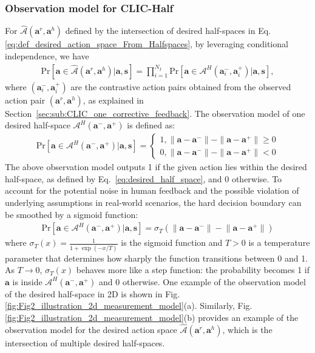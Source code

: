 \subsubsection{Observation model for CLIC-Half}
For $\hat {\mathcal{A}} {(\bm a^r, \bm a^h)}$ defined by the intersection of desired half-spaces in Eq. \eqref{eq:def_desired_action_space_From_Halfspaces}, by leveraging conditional independence, we have
\begin{align*}
    \text{Pr} [\bm a \in \hat {\mathcal{A}} {(\bm a^r, \bm a^h)}| \bm a , \bm s] =  \prod_{i=1}^{N_I} \text{Pr} [\bm a \in \mathcal{A}^H{ (\bm a^-_i, \bm a^{+}_i)}| \bm a, \bm s],
\end{align*}
where $(\bm a^-_i, \bm a^{+}_i)$ are the contrastive action pairs obtained from the observed action pair $(\bm a^r, \bm a^h)$, as explained in Section~\ref{sec:sub:CLIC_one_corrective_feedback}. The observation model of one desired half-space $\mathcal{A}^H {(\bm a^-, \bm a^+)}$ is defined as:
\begin{align*}
    \text{Pr} [\bm a \in \mathcal{A}^H {(\bm a^-, \bm a^+)} | \bm a , \bm s] \!= \!\!  \left\{ {\begin{array}{*{20}{c}}
	 1, \| \bm a- \bm a^-\| - \| \bm a- \bm a^+\| \geq 0\\
	  0, \| \bm a- \bm a^-\| - \| \bm a- \bm a^+\| < 0
	\end{array}} \right. 
\end{align*}
The above observation model outputs 1 if the given action lies within the desired half-space, as defined by Eq.~\eqref{eq:desired_half_space}, and 0 otherwise.
To account for the potential noise in human feedback and the possible violation of underlying assumptions in real-world scenarios, the hard decision boundary can be smoothed by a sigmoid function:
\begin{align}
    \text{Pr} [\bm a \in \mathcal{A}^H {(\bm a^-, \bm a^+)} | \bm a , \bm s] \!= \!  \sigma_T(\| \bm a- \bm a^-\| \!- \!\| \bm a- \bm a^+\|) \!\!
    \label{eq:observation_Model_half}
\end{align}
where $\sigma_T(x) = \frac{1}{1 + \exp (- x/T)}$ is the sigmoid function and $T > 0$ is a temperature parameter that determines how sharply the function transitions between 0 and 1. 
As $T \rightarrow 0$, $\sigma_T(x)$ behaves more like a step function: the probability becomes 1 if $\bm a$  is inside $ \mathcal{A}^H {(\bm a^-, \bm a^+)}$ and 0 otherwise. 
One example of the observation model of the desired half-space in 2D is shown in Fig. \ref{fig:Fig2_illustration_2d_measurement_model}(a). 
Similarly, Fig. \ref{fig:Fig2_illustration_2d_measurement_model}(b) provides an example of the observation model for the desired action space $\hat{\mathcal{A}} {(\bm a^r, \bm a^h)}$, which is the intersection of multiple desired half-spaces.


